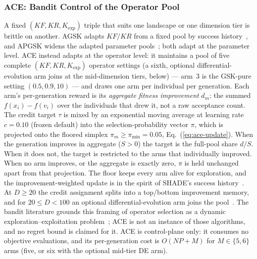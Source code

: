 \subsubsection{ACE: Bandit Control of the Operator Pool}\label{sec:alg:ace}

A fixed $(KF, KR, K_{\exp})$ triple that suits one landscape or one
dimension tier is brittle on another.
AGSK adapts $KF/KR$ from a fixed pool by success
history~\cite{mohamed2020agsk}, and APGSK widens the adapted parameter
pools~\cite{apgsk2021}; both adapt at the parameter level.
ACE instead adapts at the operator level: it maintains a pool of five complete $(KF, KR, K_{\exp})$
operator settings (a sixth, optional differential-evolution arm joins at
the mid-dimension tiers, below) --- arm~3 is the GSK-pure setting $(0.5, 0.9, 10)$
--- and draws one arm per individual per generation. %
Each arm's per-generation reward is its \emph{aggregate fitness
improvement} $d_m$: the summed $f(x_i){-}f(v_i)$ over the individuals
that drew it, not a raw acceptance count. The credit target $\tau$ is mixed
by an exponential moving average at learning rate $c=0.10$ (frozen default)
into the selection-probability vector $\pi$, which is projected onto the
floored simplex $\pi_m\ge\pi_{\min}=0.05$, Eq.~(\ref{eq:ace-update}). When the
generation improves in aggregate ($S>0$) the target is the full-pool share
$d/S$. When it does not, the target is restricted to the arms that
individually improved. When no arm improves, or the aggregate is
exactly zero, $\pi$ is held unchanged apart from that projection. The floor keeps every arm alive for exploration, and the
improvement-weighted update is in the spirit of SHADE's success
history~\cite{tanabe2013shade}. %
At $D\ge20$ the credit assignment splits into a top/bottom improvement
memory, and for $20{\le}D{<}100$ an optional differential-evolution arm
joins the pool~\cite{storn1997differential}. %
The bandit literature grounds this framing of operator selection as a
dynamic exploration--exploitation
problem~\cite{auer2002finite,fialho2010adaptive}; ACE is not an
instance of those algorithms, and no regret bound is claimed for it.
ACE is control-plane only: it consumes no objective evaluations, and
its per-generation cost is $O(NP + M)$ for $M\in\{5,6\}$ arms (five, or six
with the optional mid-tier DE arm). %

